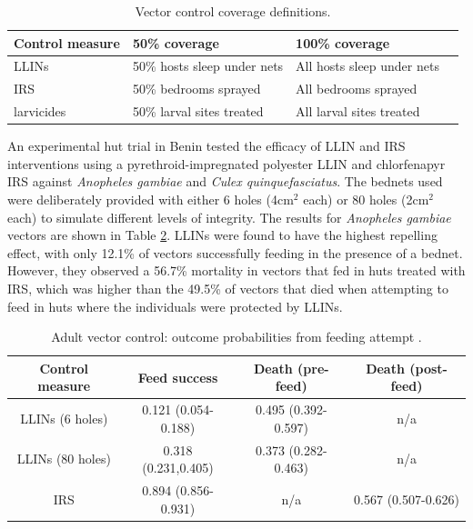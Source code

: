 \begin{table}[t]
\caption[Vector control coverage definitions.]{Vector control coverage definitions.}%
\vspace{.1cm}
\centering %
\begin{tabular}{|p{15mm}|p{54mm}|p{48mm}|c|}%
\hline                        %
Control measure & 50\% coverage & 100\% coverage \\ [0.5ex]%
\hline                  %
LLINs & 50\% hosts sleep under nets & All hosts sleep under nets \\
IRS & 50\% bedrooms sprayed & All bedrooms sprayed \\
larvicides & 50\% larval sites treated & All larval sites treated \\
[1ex]      %
\hline%
\end{tabular}
\label{table:VecControl}%
\end{table}

An experimental hut trial in Benin tested the efficacy of LLIN and IRS interventions using a pyrethroid-impregnated polyester LLIN and chlorfenapyr IRS \cite{Ngufor2011} against \textit{Anopheles gambiae} and \textit{Culex quinquefasciatus}. The bednets used were deliberately provided with either 6 holes (4cm$^2$ each) or 80 holes (2cm$^2$ each) to simulate different levels of integrity. The results for \textit{Anopheles gambiae} vectors are shown in Table \ref{table:AdultControl}. LLINs were found to have the highest repelling effect, with only 12.1\% of vectors successfully feeding in the presence of a bednet. However, they observed a 56.7\% mortality in vectors that fed in huts treated with IRS, which was higher than the 49.5\% of vectors that died when attempting to feed in huts where the individuals were protected by LLINs.

\begin{table}[t]
\caption[Adult vector control efficacy data.]{Adult vector control: outcome probabilities from feeding attempt \cite{Ngufor2011}.}%
\vspace{.1cm}
\centering %
\begin{tabular}{|c|c|c|c|}%
\hline                        %
Control measure & Feed success & Death (pre-feed) & Death (post-feed) \\ [0.5ex]%
\hline                  %
LLINs (6 holes) & 0.121 (0.054-0.188) & 0.495 (0.392-0.597) & n/a \\
LLINs (80 holes) & 0.318 (0.231,0.405) & 0.373 (0.282-0.463) & n/a \\
IRS & 0.894 (0.856-0.931) & n/a & 0.567 (0.507-0.626) \\
[1ex]      %
\hline%
\end{tabular}
\label{table:AdultControl}%
\end{table}

